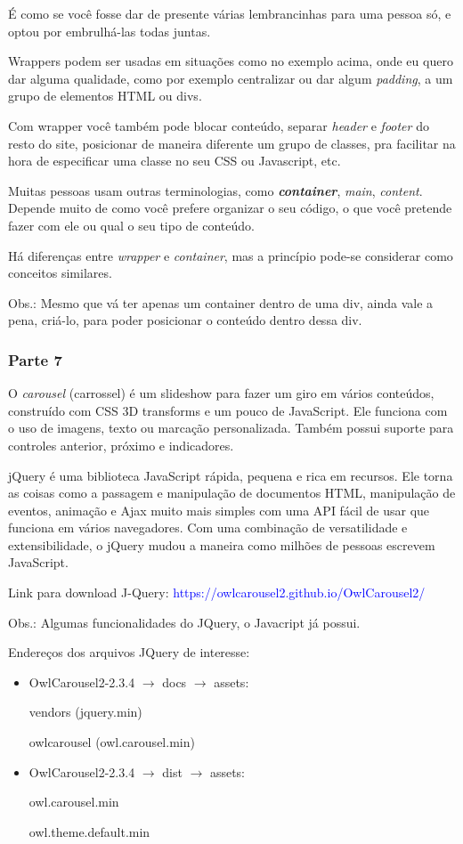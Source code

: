\documentclass[12pt,a4paper]{article}
\begin{document}
	É como se você fosse dar de presente várias lembrancinhas para uma pessoa só, e optou por embrulhá-las todas juntas.
	
	Wrappers podem ser usadas em situações como no exemplo acima, onde eu quero dar alguma qualidade, como por exemplo centralizar ou dar algum \textit{padding}, a um grupo de elementos HTML ou divs.
	
	Com wrapper você também pode blocar conteúdo, separar \textit{header} e \textit{footer} do resto do site, posicionar de maneira diferente um grupo de classes, pra facilitar na hora de especificar uma classe no seu CSS ou Javascript, etc.
	
	Muitas pessoas usam outras terminologias, como \textit{\textbf{container}}, \textit{main}, \textit{content}. Depende muito de como você prefere organizar o seu código, o que você pretende fazer com ele ou qual o seu tipo de conteúdo.
	
	Há diferenças entre \textit{wrapper} e \textit{container}, mas a princípio pode-se considerar como conceitos similares.
	
	Obs.: Mesmo que vá ter apenas um container dentro de uma div, ainda vale a pena, criá-lo, para poder posicionar o conteúdo dentro dessa div. 
	
	\subsubsection{Parte 7}
	
	O \textit{carousel} (carrossel) é um slideshow para fazer um giro em vários conteúdos, construído com CSS 3D transforms e um pouco de JavaScript. Ele funciona com o uso de imagens, texto ou marcação personalizada. Também possui suporte para controles anterior, próximo e indicadores.
	
	jQuery é uma biblioteca JavaScript rápida, pequena e rica em recursos. Ele torna as coisas como a passagem e manipulação de documentos HTML, manipulação de eventos, animação e Ajax muito mais simples com uma API fácil de usar que funciona em vários navegadores. Com uma combinação de versatilidade e extensibilidade, o jQuery mudou a maneira como milhões de pessoas escrevem JavaScript.
	
	Link para download J-Query: \textcolor{blue}{https://owlcarousel2.github.io/OwlCarousel2/}
	
	Obs.: Algumas funcionalidades do JQuery, o Javacript já possui.
	
	Endereços dos arquivos JQuery de interesse:
	\begin{itemize}
		\item 	OwlCarousel2-2.3.4 $\rightarrow$ docs $\rightarrow$ assets:
		
		vendors (jquery.min)
		
		owlcarousel (owl.carousel.min)
		
		\item OwlCarousel2-2.3.4 $\rightarrow$ dist $\rightarrow$ assets:
		
		owl.carousel.min
		
		owl.theme.default.min
	\end{itemize}
	
\end{document}
